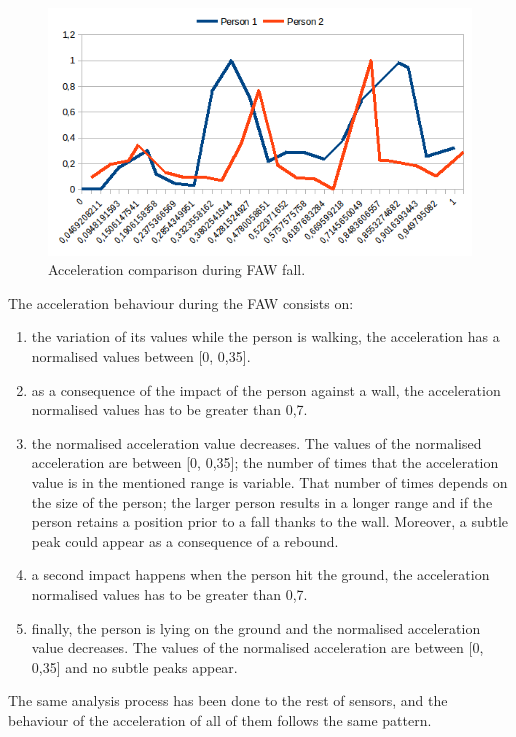 \documentclass[conference]{IEEEtran}
\theoremstyle{definition}
\begin{document}
\begin{figure}[!h]
  \centering
  \includegraphics[scale=0.35]{img/FAWComparison.png}
  \caption[Acceleration during FAW fall]{Acceleration comparison during FAW fall.}
  \label{fig:FAWcomparison}
\end{figure}

The acceleration behaviour during the FAW consists on:
\begin{enumerate}
 \item the variation of its values while the person is walking, the acceleration has a normalised values 
 between [0, 0,35].
 \item as a consequence of the impact of the person against a wall, the acceleration normalised values 
 has to be greater than 0,7.
 \item the normalised acceleration value decreases. The values of the normalised acceleration are between 
 [0, 0,35]; the number of times that the acceleration value is in the mentioned range is variable. That 
 number of times depends on the size of the person; the larger person results in a longer range and if the 
 person retains a position prior to a fall thanks to the wall. Moreover, a subtle peak could appear as a 
 consequence of a rebound.
 \item a second impact happens when the person hit the ground, the acceleration normalised values has to 
 be greater than 0,7.
 \item finally, the person is lying on the ground and the normalised acceleration value decreases. The 
 values of the normalised acceleration are between [0, 0,35] and no subtle peaks appear. 
\end{enumerate}

The same analysis process has been done to the rest of sensors, and the behaviour of the acceleration of all of them follows the same pattern.
\end{document}
